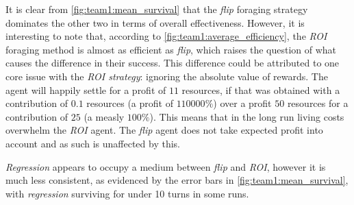 It is clear from \autoref{fig:team1:mean_survival} that the \emph{flip} foraging strategy dominates the other two in terms of overall effectiveness. However, it is interesting to note that, according to \autoref{fig:team1:average_efficiency}, the \emph{ROI} foraging method is almost as efficient as \emph{flip}, which raises the question of what causes the difference in their success. This difference could be attributed to one core issue with the \emph{ROI strategy}: ignoring the absolute value of rewards. The agent will happily settle for a profit of $11$ resources, if that was obtained with a contribution of $0.1$ resources (a profit of $110000\%$) over a profit $50$ resources for a contribution of $25$ (a measly $100\%$). This means that in the long run living costs overwhelm the \emph{ROI} agent. The \emph{flip} agent does not take expected profit into account and as such is unaffected by this.

\emph{Regression} appears to occupy a medium between \emph{flip} and \emph{ROI}, however it is much less consistent, as evidenced by the error bars in \autoref{fig:team1:mean_survival}, with \emph{regression} surviving for under 10 turns in some runs.


